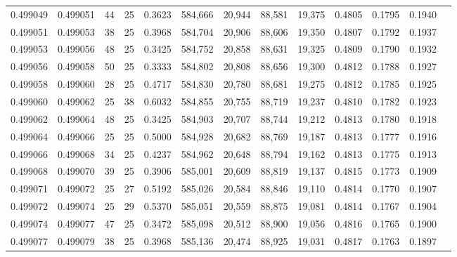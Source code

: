 \begin{tabular}{rrrrrrrrrrrrr}
0.499049 & 0.499051 &    44 &  25 &                                     0.3623 & 584,666 &  20,944 &  88,581 &  19,375 & 0.4805 & 0.1795 & 0.1940 \\
0.499051 & 0.499053 &    38 &  25 &                                     0.3968 & 584,704 &  20,906 &  88,606 &  19,350 & 0.4807 & 0.1792 & 0.1937 \\
0.499053 & 0.499056 &    48 &  25 &                                     0.3425 & 584,752 &  20,858 &  88,631 &  19,325 & 0.4809 & 0.1790 & 0.1932 \\
0.499056 & 0.499058 &    50 &  25 &                                     0.3333 & 584,802 &  20,808 &  88,656 &  19,300 & 0.4812 & 0.1788 & 0.1927 \\
0.499058 & 0.499060 &    28 &  25 &                                     0.4717 & 584,830 &  20,780 &  88,681 &  19,275 & 0.4812 & 0.1785 & 0.1925 \\
0.499060 & 0.499062 &    25 &  38 &                                     0.6032 & 584,855 &  20,755 &  88,719 &  19,237 & 0.4810 & 0.1782 & 0.1923 \\
0.499062 & 0.499064 &    48 &  25 &                                     0.3425 & 584,903 &  20,707 &  88,744 &  19,212 & 0.4813 & 0.1780 & 0.1918 \\
0.499064 & 0.499066 &    25 &  25 &                                     0.5000 & 584,928 &  20,682 &  88,769 &  19,187 & 0.4813 & 0.1777 & 0.1916 \\
0.499066 & 0.499068 &    34 &  25 &                                     0.4237 & 584,962 &  20,648 &  88,794 &  19,162 & 0.4813 & 0.1775 & 0.1913 \\
0.499068 & 0.499070 &    39 &  25 &                                     0.3906 & 585,001 &  20,609 &  88,819 &  19,137 & 0.4815 & 0.1773 & 0.1909 \\
0.499071 & 0.499072 &    25 &  27 &                                     0.5192 & 585,026 &  20,584 &  88,846 &  19,110 & 0.4814 & 0.1770 & 0.1907 \\
0.499072 & 0.499074 &    25 &  29 &                                     0.5370 & 585,051 &  20,559 &  88,875 &  19,081 & 0.4814 & 0.1767 & 0.1904 \\
0.499074 & 0.499077 &    47 &  25 &                                     0.3472 & 585,098 &  20,512 &  88,900 &  19,056 & 0.4816 & 0.1765 & 0.1900 \\
0.499077 & 0.499079 &    38 &  25 &                                     0.3968 & 585,136 &  20,474 &  88,925 &  19,031 & 0.4817 & 0.1763 & 0.1897 \\

\end{tabular}
